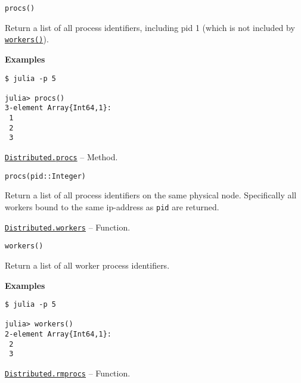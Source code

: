 \begin{adjustwidth}{2em}{0pt}


\begin{verbatim}
procs()
\end{verbatim}

Return a list of all process identifiers, including pid 1 (which is not included by \hyperlink{7474509137601932173}{\texttt{workers()}}).

\textbf{Examples}


\begin{verbatim}
$ julia -p 5

julia> procs()
3-element Array{Int64,1}:
 1
 2
 3
\end{verbatim}



\end{adjustwidth}
\hypertarget{12431527815799129129}{} 
\hyperlink{12431527815799129129}{\texttt{Distributed.procs}}  -- {Method.}

\begin{adjustwidth}{2em}{0pt}


\begin{verbatim}
procs(pid::Integer)
\end{verbatim}

Return a list of all process identifiers on the same physical node. Specifically all workers bound to the same ip-address as \texttt{pid} are returned.



\end{adjustwidth}
\hypertarget{7474509137601932173}{} 
\hyperlink{7474509137601932173}{\texttt{Distributed.workers}}  -- {Function.}

\begin{adjustwidth}{2em}{0pt}


\begin{verbatim}
workers()
\end{verbatim}

Return a list of all worker process identifiers.

\textbf{Examples}


\begin{verbatim}
$ julia -p 5

julia> workers()
2-element Array{Int64,1}:
 2
 3
\end{verbatim}



\end{adjustwidth}
\hypertarget{16165500032398890398}{} 
\hyperlink{16165500032398890398}{\texttt{Distributed.rmprocs}}  -- {Function.}

